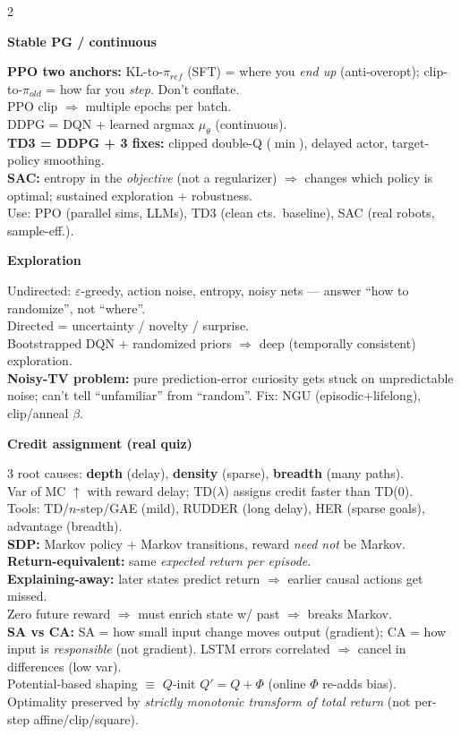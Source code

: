 \documentclass[a4paper]{article}
\newcommand{\hd}[1]{%
  \par\addvspace{3.6pt}%
  {\color{accent}\bfseries\small #1}\par
  \vspace{-4pt}{\color{accent!45}\rule{\linewidth}{0.4pt}}\par\vspace{1.2pt}}
\begin{document}
\begin{multicols}{2}
\hd{Stable PG / continuous}
\textbf{PPO two anchors:} KL-to-$\pi_{ref}$ (SFT) = where you \emph{end up} (anti-overopt); clip-to-$\pi_{old}$ = how far you \emph{step}. Don't conflate.\\
PPO clip $\Rightarrow$ multiple epochs per batch.\\
DDPG = DQN + learned argmax $\mu_\theta$ (continuous).\\
\textbf{TD3 = DDPG + 3 fixes:} clipped double-Q ($\min$), delayed actor, target-policy smoothing.\\
\textbf{SAC:} entropy in the \emph{objective} (not a regularizer) $\Rightarrow$ changes which policy is optimal; sustained exploration + robustness.\\
Use: PPO (parallel sims, LLMs), TD3 (clean cts.\ baseline), SAC (real robots, sample-eff.).

\hd{Exploration}
Undirected: $\varepsilon$-greedy, action noise, entropy, noisy nets — answer ``how to randomize'', not ``where''.\\
Directed = uncertainty / novelty / surprise.\\
Bootstrapped DQN + randomized priors $\Rightarrow$ deep (temporally consistent) exploration.\\
\textbf{Noisy-TV problem:} pure prediction-error curiosity gets stuck on unpredictable noise; can't tell ``unfamiliar'' from ``random''. Fix: NGU (episodic+lifelong), clip/anneal $\beta$.

\hd{Credit assignment (real quiz)}
3 root causes: \textbf{depth} (delay), \textbf{density} (sparse), \textbf{breadth} (many paths).\\
Var of MC $\uparrow$ with reward delay; TD($\lambda$) assigns credit faster than TD(0).\\
Tools: TD/$n$-step/GAE (mild), RUDDER (long delay), HER (sparse goals), advantage (breadth).\\
\textbf{SDP:} Markov policy + Markov transitions, reward \emph{need not} be Markov.\\
\textbf{Return-equivalent:} same \emph{expected return per episode}.\\
\textbf{Explaining-away:} later states predict return $\Rightarrow$ earlier causal actions get missed.\\
Zero future reward $\Rightarrow$ must enrich state w/ past $\Rightarrow$ breaks Markov.\\
\textbf{SA vs CA:} SA = how small input change moves output (gradient); CA = how input is \emph{responsible} (not gradient). LSTM errors correlated $\Rightarrow$ cancel in differences (low var).\\
Potential-based shaping $\equiv$ $Q$-init $Q'{=}Q{+}\Phi$ (online $\Phi$ re-adds bias).\\
Optimality preserved by \emph{strictly monotonic transform of total return} (not per-step affine/clip/square).


\end{multicols}
\end{document}
